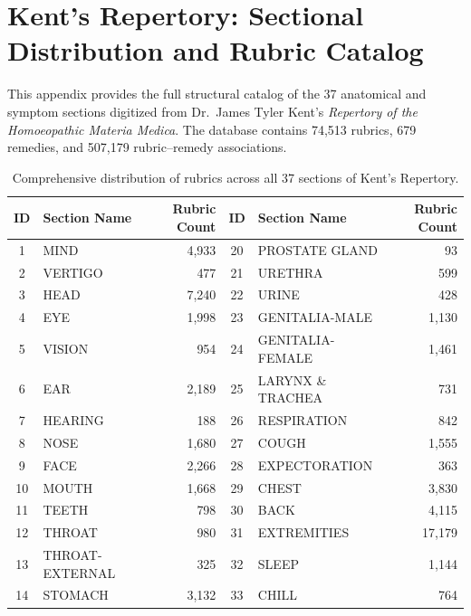 \chapter{Kent's Repertory: Sectional Distribution and Rubric Catalog}
\label{AppendixA}

\begin{sloppypar}
This appendix provides the full structural catalog of the 37 anatomical and symptom sections digitized from Dr.~James Tyler Kent's \emph{Repertory of the Homoeopathic Materia Medica}. The database contains 74,513 rubrics, 679 remedies, and 507,179 rubric--remedy associations.

\begin{table}[htp]
\centering
\small
\caption{Comprehensive distribution of rubrics across all 37 sections of Kent's Repertory.}
\label{tab:kent_sections_all}
\begin{tabular}{|c|l|r||c|l|r|}
\hline
\textbf{ID} & \textbf{Section Name} & \textbf{Rubric Count} & \textbf{ID} & \textbf{Section Name} & \textbf{Rubric Count} \\
\hline
1  & MIND               & 4,933  & 20 & PROSTATE GLAND     & 93     \\
2  & VERTIGO            & 477    & 21 & URETHRA            & 599    \\
3  & HEAD               & 7,240  & 22 & URINE              & 428    \\
4  & EYE                & 1,998  & 23 & GENITALIA-MALE     & 1,130  \\
5  & VISION             & 954    & 24 & GENITALIA-FEMALE   & 1,461  \\
6  & EAR                & 2,189  & 25 & LARYNX \& TRACHEA  & 731    \\
7  & HEARING            & 188    & 26 & RESPIRATION        & 842    \\
8  & NOSE               & 1,680  & 27 & COUGH              & 1,555  \\
9  & FACE               & 2,266  & 28 & EXPECTORATION      & 363    \\
10 & MOUTH              & 1,668  & 29 & CHEST              & 3,830  \\
11 & TEETH              & 798    & 30 & BACK               & 4,115  \\
12 & THROAT             & 980    & 31 & EXTREMITIES        & 17,179 \\
13 & THROAT-EXTERNAL    & 325    & 32 & SLEEP              & 1,144  \\
14 & STOMACH            & 3,132  & 33 & CHILL              & 764    \\

\end{tabular}
\end{table}
\end{sloppypar}
